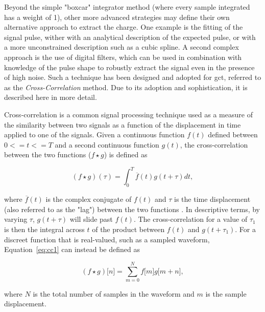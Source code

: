 Beyond the simple "boxcar" integrator method (where every sample integrated has a weight of 1), other more advanced strategies may define their own alternative approach to extract the charge. One example is the fitting of the signal pulse, wither with an analytical description of the expected pulse, or with a more unconstrained description such as a cubic spline. A second complex approach is the use of digital filters, which can be used in combination with knowledge of the pulse shape to robustly extract the signal even in the presence of high noise. Such a technique has been designed and adopted for \gls{gct}, referred to as the \textit{Cross-Correlation} method. Due to its adoption and sophistication, it is described here in more detail. 

Cross-correlation is a common signal processing technique used as a measure of the similarity between two signals as a function of the displacement in time applied to one of the signals. Given a continuous function $f(t)$ defined between $0 <= t <= T$ and a second continuous function $g(t)$, the cross-correlation between the two functions ($f \star g$) is defined as 

\begin{equation} \label{eq:cc1}
(f \star g)(\tau) = \int_0^T \overline{f}(t)g(t + \tau)dt,
\end{equation}

where $\overline{f}(t)$ is the complex conjugate of $f(t)$ and $\tau$ is the time displacement (also referred to as the "lag") between the two functions \cite{wolfram-crosscorrelate}. In descriptive terms, by varying $\tau$, $g(t + \tau)$ will slide past $f(t)$. The cross-correlation for a value of $\tau_1$ is then the integral across $t$ of the product between $f(t)$ and $g(t + \tau_1)$. For a discreet function that is real-valued, such as a sampled waveform, Equation~\ref{eq:cc1} can instead be defined as

\begin{equation} \label{eq:cc2}
(f \star g)\lbrack n \rbrack = \sum_{m=0}^N f\lbrack m \rbrack g\lbrack m + n\rbrack,
\end{equation}

where $N$ is the total number of samples in the waveform and $m$ is the sample displacement. 

